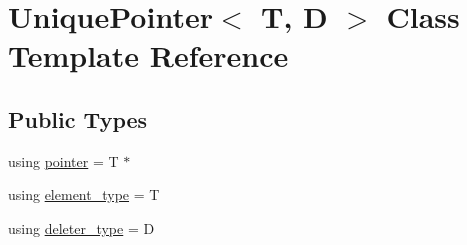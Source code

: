 \hypertarget{class_unique_pointer}{}\section{Unique\+Pointer$<$ T, D $>$ Class Template Reference}
\label{class_unique_pointer}
\subsection*{Public Types}
\begin{DoxyCompactItemize}
\item 
using \hyperlink{class_unique_pointer_a3894408ba9899edc0388aeb018833414}{pointer} = T $\ast$
\item 
using \hyperlink{class_unique_pointer_a0ccc3b99b9fef0fb9a8d738793535fc2}{element\+\_\+type} = T
\item 
using \hyperlink{class_unique_pointer_aea5e9d2fa26d0acca416a9e9451e08c3}{deleter\+\_\+type} = D
\end{DoxyCompactItemize}
